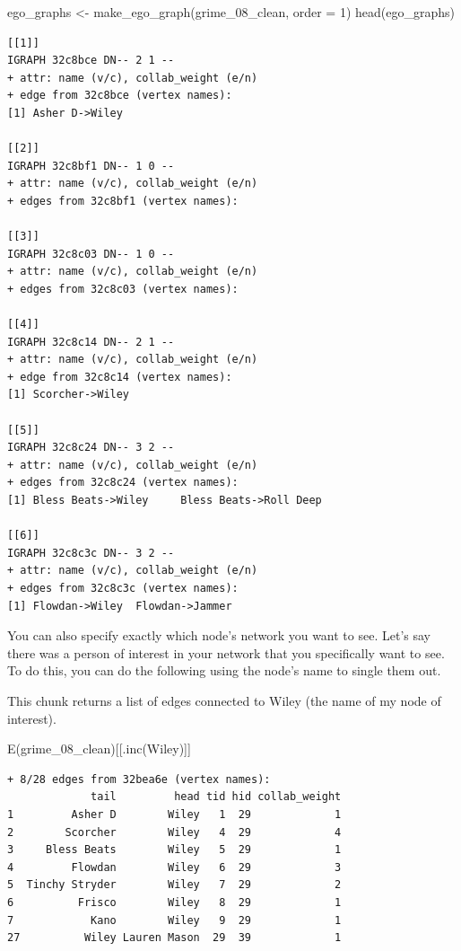 \documentclass[
  letterpaper,
  DIV=11,
  numbers=noendperiod]{scrreprt}
\newenvironment{Shaded}{\begin{snugshade}}{\end{snugshade}}
\newcommand{\AttributeTok}[1]{\textcolor[rgb]{0.40,0.45,0.13}{#1}}
\newcommand{\DecValTok}[1]{\textcolor[rgb]{0.68,0.00,0.00}{#1}}
\newcommand{\FunctionTok}[1]{\textcolor[rgb]{0.28,0.35,0.67}{#1}}
\newcommand{\NormalTok}[1]{\textcolor[rgb]{0.00,0.23,0.31}{#1}}
\newcommand{\OtherTok}[1]{\textcolor[rgb]{0.00,0.23,0.31}{#1}}
\newcommand{\StringTok}[1]{\textcolor[rgb]{0.13,0.47,0.30}{#1}}
\begin{document}
\begin{Shaded}
\begin{Highlighting}[]
\NormalTok{ego\_graphs }\OtherTok{\textless{}{-}} \FunctionTok{make\_ego\_graph}\NormalTok{(grime\_08\_clean, }\AttributeTok{order =} \DecValTok{1}\NormalTok{)}
\FunctionTok{head}\NormalTok{(ego\_graphs)}
\end{Highlighting}
\end{Shaded}

\begin{verbatim}
[[1]]
IGRAPH 32c8bce DN-- 2 1 -- 
+ attr: name (v/c), collab_weight (e/n)
+ edge from 32c8bce (vertex names):
[1] Asher D->Wiley

[[2]]
IGRAPH 32c8bf1 DN-- 1 0 -- 
+ attr: name (v/c), collab_weight (e/n)
+ edges from 32c8bf1 (vertex names):

[[3]]
IGRAPH 32c8c03 DN-- 1 0 -- 
+ attr: name (v/c), collab_weight (e/n)
+ edges from 32c8c03 (vertex names):

[[4]]
IGRAPH 32c8c14 DN-- 2 1 -- 
+ attr: name (v/c), collab_weight (e/n)
+ edge from 32c8c14 (vertex names):
[1] Scorcher->Wiley

[[5]]
IGRAPH 32c8c24 DN-- 3 2 -- 
+ attr: name (v/c), collab_weight (e/n)
+ edges from 32c8c24 (vertex names):
[1] Bless Beats->Wiley     Bless Beats->Roll Deep

[[6]]
IGRAPH 32c8c3c DN-- 3 2 -- 
+ attr: name (v/c), collab_weight (e/n)
+ edges from 32c8c3c (vertex names):
[1] Flowdan->Wiley  Flowdan->Jammer
\end{verbatim}

You can also specify exactly which node's network you want to see. Let's
say there was a person of interest in your network that you specifically
want to see. To do this, you can do the following using the node's name
to single them out.

This chunk returns a list of edges connected to Wiley (the name of my
node of interest).

\begin{Shaded}
\begin{Highlighting}[]
\FunctionTok{E}\NormalTok{(grime\_08\_clean)[[}\FunctionTok{.inc}\NormalTok{(}\StringTok{\textquotesingle{}Wiley\textquotesingle{}}\NormalTok{)]]}
\end{Highlighting}
\end{Shaded}

\begin{verbatim}
+ 8/28 edges from 32bea6e (vertex names):
             tail         head tid hid collab_weight
1         Asher D        Wiley   1  29             1
2        Scorcher        Wiley   4  29             4
3     Bless Beats        Wiley   5  29             1
4         Flowdan        Wiley   6  29             3
5  Tinchy Stryder        Wiley   7  29             2
6          Frisco        Wiley   8  29             1
7            Kano        Wiley   9  29             1
27          Wiley Lauren Mason  29  39             1
\end{verbatim}
\end{document}
